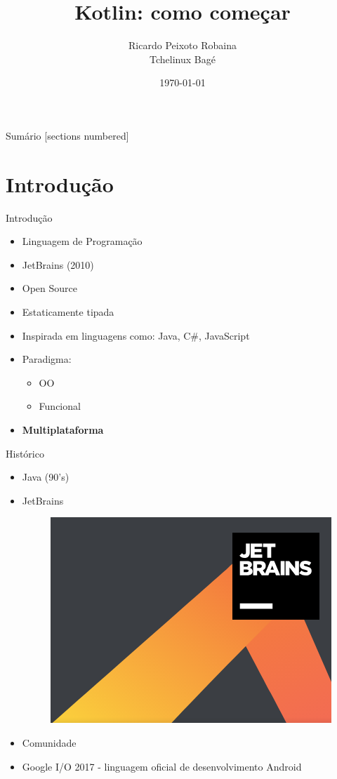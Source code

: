 \documentclass{beamer}
\title{Kotlin: como começar}
\date{\today}
\author{Ricardo Peixoto Robaina \\ Tchelinux Bagé}
\institute{Universidade Federal do Pampa}
\begin{document}
	
	\begin{frame}[noframenumbering]
		\titlepage
		\thispagestyle{empty}
	\end{frame}
	
	\begin{frame}{Sumário}
		[sections numbered]
		\tableofcontents[hideallsubsections]
	\end{frame}

\section{Introdução}
	\begin{frame}{Introdução}
		
		\begin{itemize}
			\item Linguagem de Programação
			\item JetBrains (2010)
			\item Open Source
			\item Estaticamente tipada
			\item Inspirada em linguagens como: Java, C#, JavaScript
			\item Paradigma:
				\begin{itemize}
					\item OO
					\item Funcional
				\end{itemize}
			
			\item \textbf{Multiplataforma}
		\end{itemize}
	
	\end{frame}

	\begin{frame}{Histórico}
		\begin{itemize}
			\item Java (90's)
			\item JetBrains
			\begin{figure}[!htb]
				\centering
				\includegraphics[scale=.20]{jetBrains.png}
			\end{figure}
			\item Comunidade
			\item Google I/O 2017 - linguagem oficial de desenvolvimento Android
		\end{itemize}
	
	\end{frame}
\end{document}
